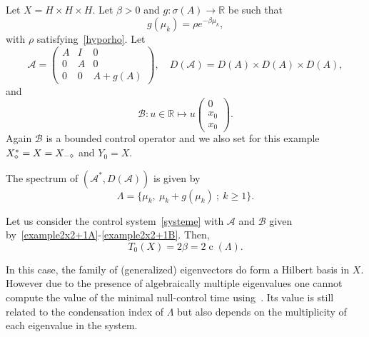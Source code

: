 \documentclass[AHL,Unicode,longabstracts]{cedram}
\newcommand\A{\mathcal{A}}
\newcommand\As{\mathcal{A}^*}
\newcommand\B{\mathcal{B}}
\newcommand{\DA}{D(\A)}
\newcommand{\Xalphas}{X_\diamond^*}
\newcommand{\Xmalpha}{X_{-\diamond}}
\newcommand{\Fzp}{Y_0}
\newcommand{\R}{\mathbb{R}}
\DeclareMathOperator{\cond}{c}
\begin{document}
Let $X=H\times H\times H$. Let $\beta>0$ and $g : \sigma(A) \to \R$ be such that
\begin{equation}\label{Def_g_1}
g(\mu_k) = \rho e^{-\beta \mu_k},
\end{equation}
with $\rho$ satisfying~\eqref{hyporho}. Let
\begin{equation}\label{example2x2+1A}
\A=
\begin{pmatrix} A & I & 0 \\ 0 & A & 0 \\ 0 & 0 &A+g(A)
\end{pmatrix},
\quad
\DA=D(A)\times D(A)\times D(A),
\end{equation}
and
\begin{equation}\label{example2x2+1B}
\B : u \in \R \mapsto u
\begin{pmatrix} 0 \\ x_0 \\ x_0
\end{pmatrix}.
\end{equation}
Again $\B$ is a bounded control operator and we also set for this example $\Xalphas = X\linebreak= \Xmalpha$ and $\Fzp=X$.

The spectrum of $(\As, \DA)$ is given by
\[
\Lambda = \{ \mu_k, \: \mu_k+g(\mu_k) \: ; \: k \geq 1\}.
\]

\begin{prop}\label{Prop:Academique2}
Let us consider the control system~\eqref{systeme} with $\A$ and $\B$ given by~\eqref{example2x2+1A}-\eqref{example2x2+1B}. Then,
\begin{equation}\label{T0_Academique2}
T_0(X) = 2\beta = 2 \cond(\Lambda).
\end{equation}
\end{prop}

\begin{rema}
In this case, the family of (generalized) eigenvectors do form a Hilbert basis in $X$. However due to the presence of algebraically multiple eigenvalues one cannot compute the value of the minimal null-control time using~\cite{AmmarKhodjaBenabdallahGonzalez-BurgosdeTeresa:2014}. Its value is still related to the condensation index of $\Lambda$ but also depends on the multiplicity of each eigenvalue in the system.
\end{rema}
\end{document}
